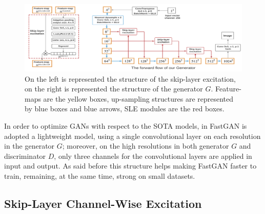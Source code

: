 \documentclass[12pt]{article}
\begin{document}
\begin{figure}[H]
	\label{fig:fig2}
	\includegraphics[width=1\textwidth]{Images/structure.png}
	\caption{
		On the left is represented the structure of the skip-layer excitation,
		on the right is represented the structure of the generator $G$. 
		Feature-maps are the yellow boxes, up-sampling structures are represented 
		by blue boxes and blue arrows, SLE modules are the red boxes.
		}
\end{figure}
In order to optimize GANs with respect to the SOTA models, in FastGAN is adopted a lightweight model, 
using a single convolutional layer on each resolution in the generator $G$; moreover, on the high resolutions
in both generator $G$ and discriminator $D$, only three channels for the convolutional layers are applied in 
input and output. As said before this structure helps making FastGAN faster to train, remaining, at the same time,
strong on small datasets. 

\subsection{Skip-Layer Channel-Wise Excitation}
\end{document}
